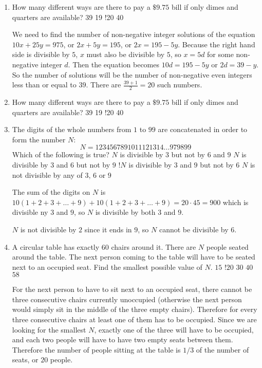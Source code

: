 \documentclass{article}
\begin{document}
\begin{enumerate}
	\item How many different ways are there to pay a $\$9.75$ bill if only
	dimes and quarters are available?
	\MultChoiceNOTA%
	{39}
	{19}
	{!20}%
	{40}
	\begin{solution}
		We need to find the number of non-negative integer solutions of the
		equation $10x + 25y = 975$, or $2x + 5y = 195$, or $2x = 195 - 5y$.
		Because the right hand side is divisible by $5$, $x$ must also be
		divisible by $5$, so $x=5d$ for some non-negative integer $d$. Then
		the equation becomes $10d = 195 - 5y$ or $2d = 39 - y$. So the number
		of solutions will be the number of non-negative even integers less
		than or equal to $39$.  There are $\frac{39+1}{2} = 20$ such numbers.
	\end{solution}

	\item How many different ways are there to pay a $\$9.75$ bill if only
	dimes and quarters are available?
	\MultChoiceNOTA%
	{39}
	{19}
	{!20}%
	{40}

	\item The digits of the whole numbers from $1$ to $99$ are concatenated in
	order to form the number $N$:
	\[N = 1234567891011121314\dots979899\]
	Which of the following is true?
	\MultChoiceNOTA%
	{$N$ is divisible by $3$ but not by $6$ and $9$}
	{$N$ is divisible by $3$ and $6$ but not by $9$}
	{!$N$ is divisible by $3$ and $9$ but not by $6$}
	{$N$ is not divisible by any of $3$, $6$ or $9$}
	\begin{solution}
		The sum of the digits on $N$ is $10(1 + 2 + 3 + \dots + 9) + 10(1 + 2 +
		3 + \dots + 9) = 20\cdot 45 = 900$ which is
		divisible ny $3$ and $9$, so $N$ is divisible by both $3$ and $9$.

		$N$ is not divisible by $2$ since it ends in $9$, so $N$ cannot be
		divisible by $6$.
	\end{solution}

	\item A circular table has exactly $60$ chairs around it.  There are $N$
	people seated around the table.  The next person coming to the table will
	have to be seated next to an occupied seat.  Find the smallest possible
	value of $N$.
	\MultChoice%
	{$15$}
	{!$20$}
	{$30$}
	{$40$}
	{$58$}
	\begin{solution}
		For the next person to have to sit next to an occupied seat, there
		cannot be three consecutive chairs currently unoccupied (otherwise
		the next person would simply sit in the middle of the three empty
		chairs).  Therefore for every three consecutive chairs at least one of them
		has to be occupied. Since we are looking for the smallest $N$,
		exactly one of the three will have to be occupied, and each two
		people will have to have two empty seats between them.  Therefore the
		number of people sitting at the table is $1/3$ of the number of
		seats, or $20$ people. 
	\end{solution}
\end{enumerate}
\end{document}
